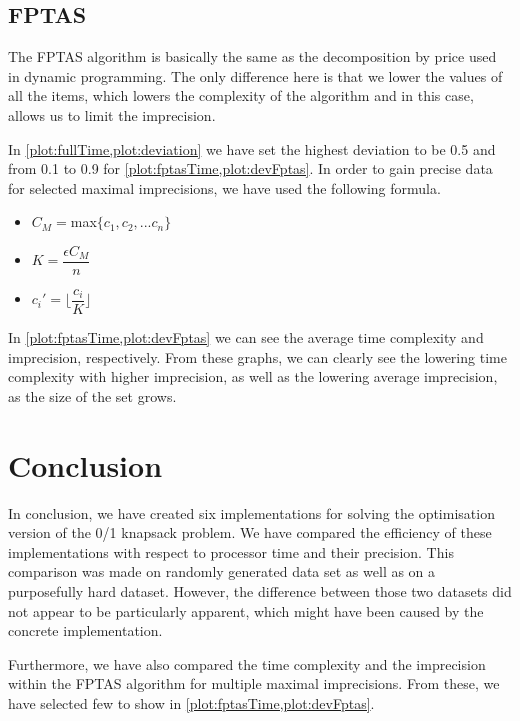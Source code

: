 \subsection{FPTAS}

The FPTAS algorithm is basically the same as the decomposition by price used in dynamic programming.
The only difference here is that we lower the values of all the items, which lowers the complexity
of the algorithm and in this case, allows us to limit the imprecision.

In \cref{plot:fullTime,plot:deviation} we have set the highest deviation to be 0.5 and from 0.1 to 0.9 for \cref{plot:fptasTime,plot:devFptas}.
In order to gain precise data for selected maximal imprecisions, we have used the following formula.

\begin{itemize}
    \item $C_M = $max$\{c_1,c_2, ... c_n\}$
    \item $K = \dfrac{\epsilon C_M}{n}$
    \item $c_i' = \lfloor\dfrac{c_i}{K}\rfloor$
\end{itemize}

In \cref{plot:fptasTime,plot:devFptas} we can see the average time complexity and imprecision, respectively. From these graphs, we can clearly see the lowering time complexity with higher imprecision, as well as the lowering average imprecision, as the size of the set grows. 
% 





\newpage

\section{Conclusion}
In conclusion, we have created six implementations for solving the optimisation version of the 0/1 knapsack problem. We have compared the efficiency of these implementations with respect to processor time and their precision. This comparison was made on randomly generated data set as well as on a purposefully hard dataset. However, the difference between those two datasets did not appear to be particularly apparent, which might have been caused by the concrete implementation.

Furthermore,  we have also compared the time complexity and the imprecision within the FPTAS algorithm for multiple maximal imprecisions. From these, we have selected few to show in \cref{plot:fptasTime,plot:devFptas}.

\newpage

\nocite{*} %



